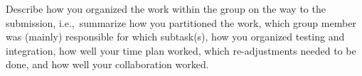 Describe how you organized the work within the group on the way to the 
submission, i.e.,~summarize how you partitioned the work, which group 
member was (mainly) responsible for which subtask(s), how you organized 
testing and integration, how well your time plan worked, which 
re-adjustments needed to be done, and how well your collaboration 
worked.
